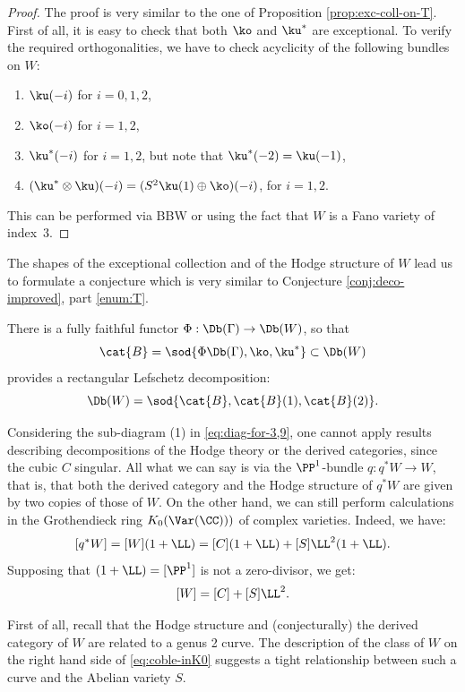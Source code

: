 \begin{proof}
The proof is very similar to the one of Proposition \ref{prop:exc-coll-on-T}. First of all, it is easy to check
that both $\ko$ and $\ku^*$ are exceptional. To verify the required orthogonalities, we have to check
acyclicity of the following bundles on $W$:
\begin{enumerate}
\item $\ku(-i)$ for $i=0,1,2$,
\item $\ko(-i)$ for $i=1,2$,
\item $\ku^*(-i)$ for $i=1,2$, but note that $\ku^*(-2)=\ku(-1)$,
\item $(\ku^* \otimes \ku)(-i) = (S^2 \ku(1) \oplus \ko)(-i)$, for $i=1,2$.
\end{enumerate}
This can be performed via BBW or using the fact that $W$ is a Fano variety of index~$3$.
\end{proof}
The shapes of the exceptional collection and of the Hodge structure of $W$ lead us to formulate
a conjecture which is very similar to Conjecture \ref{conj:deco-improved}, part \eqref{enum:T}.

\begin{conjecture}\label{conj:deco-for-T29}
There is a fully faithful functor $\Phi: \Db(\Gamma) \to \Db(W)$, so that
\[
\cat{B}=\sod{\Phi \Db(\Gamma),\ko,\ku^*} \subset \Db(W)
\]
provides a rectangular Lefschetz decomposition:
\[
\Db(W)=\sod{\cat{B},\cat{B}(1),\cat{B}(2)}.
\]
\end{conjecture}

Considering the sub-diagram (1) in \eqref{eq:diag-for-3,9}, one cannot apply results describing decom\-positions of the
Hodge theory or the derived categories, since the cubic $C$ singular. All what we can say is via the
$\PP^1$-bundle $q: q^* W \to W$, that is, that both the derived category and the Hodge structure of $q^*W$
are given by two copies of those of $W$. On the other hand, we can still perform calculations in the
Grothendieck ring $K_0(\Var(\CC)))$ of complex varieties. Indeed, we have:
\[
[q^*W] = [W](1+\LL) = [C](1+\LL) + [S]\LL^2 (1+\LL).
\]
Supposing that $(1+\LL) = [\PP^1]$ is not a zero-divisor, we get:
\begin{equation}\label{eq:coble-inK0}
[W] = [C] + [S]\LL^2.
\end{equation}

First of all, recall that the Hodge structure and (conjecturally) the derived category
of $W$ are related to a genus 2 curve. The description of the class of $W$ on the right hand
side of \eqref{eq:coble-inK0} suggests a tight relationship between such a curve and the Abelian
variety $S$.

